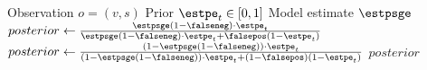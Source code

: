 \begin{singlespace}
    \begin{algorithm}[H]
        \caption{Bayesian Update Step}
        \label{alg:bayesian_update_impl}
        \begin{algorithmic}
            \Require Observation $o = (v, s)$
            \Require Prior $\estpe_t \in [0,1]$
            \Require Model estimate $\estpsge$
            \State $posterior \gets \frac{\estpsge (1 - \falseneg) \cdot \estpe_t}{\estpsge (1 - \falseneg) \cdot \estpe_t + \falsepos (1 - \estpe_t)}$
            \Else
            \State $posterior \gets \frac{(1 - \estpsge (1 - \falseneg)) \cdot \estpe_t}{(1 - \estpsge (1 - \falseneg)) \cdot \estpe_t + (1 - \falsepos)(1 - \estpe_t)}$
            \EndIf
            \State \Return $posterior$
        \end{algorithmic}
    \end{algorithm}
\end{singlespace}
